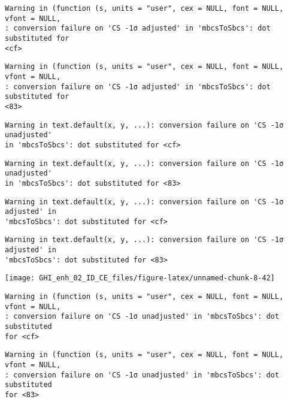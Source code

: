 \documentclass[
  10pt,
  a4paper,oneside]{article}
\begin{document}
\begin{verbatim}
Warning in (function (s, units = "user", cex = NULL, font = NULL, vfont = NULL,
: conversion failure on 'CS -1σ adjusted' in 'mbcsToSbcs': dot substituted for
<cf>
\end{verbatim}

\begin{verbatim}
Warning in (function (s, units = "user", cex = NULL, font = NULL, vfont = NULL,
: conversion failure on 'CS -1σ adjusted' in 'mbcsToSbcs': dot substituted for
<83>
\end{verbatim}

\begin{verbatim}
Warning in text.default(x, y, ...): conversion failure on 'CS -1σ unadjusted'
in 'mbcsToSbcs': dot substituted for <cf>
\end{verbatim}

\begin{verbatim}
Warning in text.default(x, y, ...): conversion failure on 'CS -1σ unadjusted'
in 'mbcsToSbcs': dot substituted for <83>
\end{verbatim}

\begin{verbatim}
Warning in text.default(x, y, ...): conversion failure on 'CS -1σ adjusted' in
'mbcsToSbcs': dot substituted for <cf>
\end{verbatim}

\begin{verbatim}
Warning in text.default(x, y, ...): conversion failure on 'CS -1σ adjusted' in
'mbcsToSbcs': dot substituted for <83>
\end{verbatim}

\begin{center}\texttt{[image: GHI\_enh\_02\_ID\_CE\_files/figure-latex/unnamed-chunk-8-42]} \end{center}

\begin{verbatim}
Warning in (function (s, units = "user", cex = NULL, font = NULL, vfont = NULL,
: conversion failure on 'CS -1σ unadjusted' in 'mbcsToSbcs': dot substituted
for <cf>
\end{verbatim}

\begin{verbatim}
Warning in (function (s, units = "user", cex = NULL, font = NULL, vfont = NULL,
: conversion failure on 'CS -1σ unadjusted' in 'mbcsToSbcs': dot substituted
for <83>
\end{verbatim}
\end{document}

